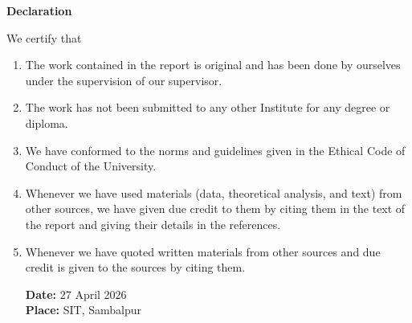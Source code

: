 \vspace*{0.5cm}
\begin{center}
	\textbf{\Large Declaration}
\end{center}
\flushleft
\justify
We certify that 
\begin{enumerate}[label=(\alph*)]
	\item The work contained in the report is original and has been done by ourselves under the supervision of our supervisor.
	\item The work has not been submitted to any other Institute for any degree or diploma.
	\item We have conformed to the norms and guidelines given in the Ethical Code of Conduct of the University.
	\item Whenever we have used materials (data, theoretical analysis, and text) from other sources, we have given due credit to them by citing them in the text of the report and giving their details in the references.
	\item Whenever we have quoted written materials from other sources and due credit is given to the sources by citing them.
	
\flushleft
\textbf{Date:} 27 April 2026 \\
\textbf{Place:} SIT, Sambalpur \\
\end{enumerate}

